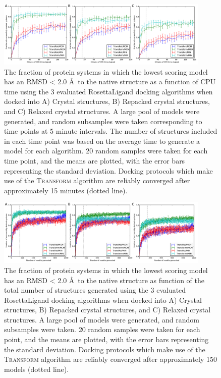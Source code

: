 \begin{figure}
\centering
\includegraphics[width=4in]{figures/lowres/fraction_successful_time.pdf}
\caption{
The fraction of protein systems in which the lowest scoring model has an RMSD < 2.0 \AA\ to the native structure as a function of \acs{CPU} time using the 3 evaluated RosettaLigand docking algorithms when docked into A) Crystal structures, B) Repacked crystal structures, and C) Relaxed crystal structures.
A large pool of models were generated, and random subsamples were taken corresponding to time points at 5 minute intervals.
The number of structures included in each time point was based on the average time to generate a model for each algorithm.
20 random samples were taken for each time point, and the means are plotted, with the error bars representing the standard deviation.
Docking protocols which make use of the \textsc{Transform}  algorithm are reliably converged after approximately 15 minutes (dotted line).
}
\label{fig:fraction_successful_time}
\end{figure}

\begin{figure}
\centering
\includegraphics[width=4in]{figures/lowres/fraction_successful_count.pdf}
\caption{
The fraction of protein systems in which the lowest scoring model has an \acs{RMSD} < 2.0 \AA\ to the native structure as function of the total number of structures generated using the 3 evaluated RosettaLigand docking algorithms when docked into A) Crystal structures, B) Repacked crystal structures, and C) Relaxed crystal structures.
A large pool of models were generated, and random subsamples were taken.  20 random samples were taken for each point, and the means are plotted, with the error bars representing the standard deviation.
Docking protocols which make use of the \textsc{Transform} algorithm are reliably converged after approximately 150 models (dotted line).
}
\label{fig:fraction_successful_count}
\end{figure}

